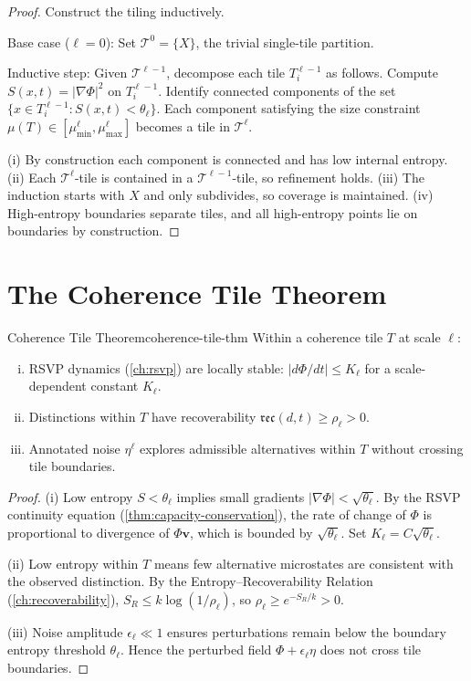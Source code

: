 \documentclass[12pt,twoside,openright]{book}
\newcommand{\reco}{\mathfrak{rec}}
\begin{document}
\begin{proof}
  Construct the tiling inductively.

  Base case ($\ell = 0$): Set $\mathcal{T}^0 = \{X\}$,
  the trivial single-tile partition.

  Inductive step: Given $\mathcal{T}^{\ell-1}$, decompose
  each tile $T^{\ell-1}_i$ as follows.
  Compute $S(x,t) = |\nabla\Phi|^2$ on $T^{\ell-1}_i$.
  Identify connected components of the set
  $\{x \in T^{\ell-1}_i : S(x,t) < \theta_\ell\}$.
  Each component satisfying the size constraint
  $\mu(T) \in [\mu_{\min}^\ell, \mu_{\max}^\ell]$
  becomes a tile in $\mathcal{T}^\ell$.

  (i) By construction each component is connected and
  has low internal entropy.
  (ii) Each $\mathcal{T}^\ell$-tile is contained in a
  $\mathcal{T}^{\ell-1}$-tile, so refinement holds.
  (iii) The induction starts with $X$ and only subdivides,
  so coverage is maintained.
  (iv) High-entropy boundaries separate tiles, and all
  high-entropy points lie on boundaries by construction.
\end{proof}

\section{The Coherence Tile Theorem}

\begin{theorem}{Coherence Tile Theorem}{coherence-tile-thm}
  Within a coherence tile $T$ at scale $\ell$:
  \begin{enumerate}[(i)]
    \item RSVP dynamics (\cref{ch:rsvp}) are locally
          stable: $|d\Phi/dt| \le K_\ell$ for a
          scale-dependent constant $K_\ell$.
    \item Distinctions within $T$ have recoverability
          $\reco(d, t) \ge \rho_\ell > 0$.
    \item Annotated noise $\eta^\ell$ explores
          admissible alternatives within $T$ without
          crossing tile boundaries.
  \end{enumerate}
\end{theorem}

\begin{proof}
  (i) Low entropy $S < \theta_\ell$ implies small
  gradients $|\nabla\Phi| < \sqrt{\theta_\ell}$.
  By the RSVP continuity equation
  (\cref{thm:capacity-conservation}), the rate of
  change of $\Phi$ is proportional to divergence of
  $\Phi \mathbf{v}$, which is bounded by
  $\sqrt{\theta_\ell}$. Set
  $K_\ell = C\sqrt{\theta_\ell}$.

  (ii) Low entropy within $T$ means few alternative
  microstates are consistent with the observed
  distinction. By the Entropy--Recoverability Relation
  (\cref{ch:recoverability}), $S_R \le k\log(1/\rho_\ell)$,
  so $\rho_\ell \ge e^{-S_R/k} > 0$.

  (iii) Noise amplitude $\epsilon_\ell \ll 1$ ensures
  perturbations remain below the boundary entropy
  threshold $\theta_\ell$. Hence the perturbed field
  $\Phi + \epsilon_\ell \eta$ does not cross tile
  boundaries.
\end{proof}
\end{document}

